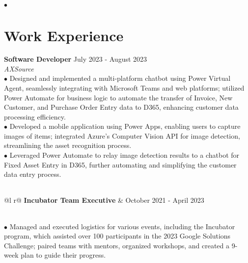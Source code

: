 \documentclass[letterpaper,12pt]{article}
\begin{document}
\hspace{0.3cm} $\bullet$ 

\section{Work Experience}

\textbf{Software Developer}  \hfill   July 2023 - August 2023 \\
\textit{AXSource} 
\vspace{0.3cm}  
\\\hspace{0.1cm} $\bullet$ \hspace{1em}Designed and implemented a multi-platform chatbot using Power Virtual Agent, seamlessly integrating with Microsoft Teams and web platforms; utilized Power Automate for business logic to automate the transfer of Invoice, New Customer, and Purchase Order Entry data to D365, enhancing customer data processing efficiency.\\
\hspace{0.1cm} $\bullet$ \hspace{1em}Developed a mobile application using Power Apps, enabling users to capture images of items; integrated Azure's Computer Vision API for image detection, streamlining the asset recognition process. \\
\hspace{0.1cm} $\bullet$  \hspace{1em}Leveraged Power Automate to relay image detection results to a chatbot for Fixed Asset Entry in D365, further automating and simplifying the customer data entry process. \\\\
\begin{tabularx}{\linewidth}{ @{}l r@{} }
    \textbf{Incubator Team Executive} &  \hfill \normalsize{October 2021 - April 2023} \\
\end{tabularx} 
\vspace{0.25cm} \\
\hspace{0.1cm} $\bullet$ \hspace{0.35cm}Managed and executed logistics for various events, including the Incubator program, which assisted over 100 participants in the 2023 Google Solutions Challenge; paired teams with mentors, organized workshops, and created a 9-week plan to guide their progress. \\ 
\end{document}
